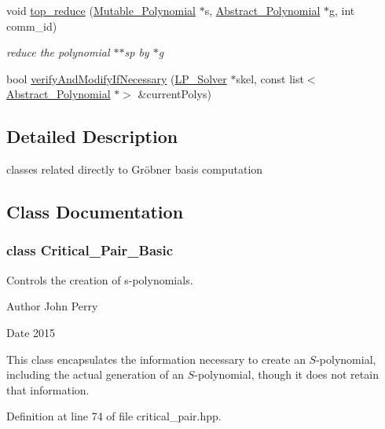 \begin{DoxyCompactItemize}
void \hyperlink{group___g_b_computation_ga459782e1aa0e3b2b4a6569bcd27150cc}{top\+\_\+reduce} (\hyperlink{group__polygroup_class_mutable___polynomial}{Mutable\+\_\+\+Polynomial} $\ast$s, \hyperlink{group__polygroup_class_abstract___polynomial}{Abstract\+\_\+\+Polynomial} $\ast$g, int comm\+\_\+id)
\begin{DoxyCompactList}\small\item\em reduce the polynomial {\ttfamily $\ast$$\ast$sp} by {\ttfamily $\ast$g} \end{DoxyCompactList}\item 
bool \hyperlink{group___g_b_computation_ga7d0ce10bf904206db71f7e011ba551b3}{verify\+And\+Modify\+If\+Necessary} (\hyperlink{group___c_l_s_solvers_class_l_p___solver}{L\+P\+\_\+\+Solver} $\ast$skel, const list$<$ \hyperlink{group__polygroup_class_abstract___polynomial}{Abstract\+\_\+\+Polynomial} $\ast$$>$ \&current\+Polys)
\end{DoxyCompactItemize}


\subsection{Detailed Description}
classes related directly to Gr\"{o}bner basis computation 



\subsection{Class Documentation}
\label{class_critical___pair___basic}
\subsubsection{class Critical\+\_\+\+Pair\+\_\+\+Basic}
Controls the creation of s-\/polynomials. 

\begin{DoxyAuthor}{Author}
John Perry 
\end{DoxyAuthor}
\begin{DoxyDate}{Date}
2015
\end{DoxyDate}
This class encapsulates the information necessary to create an $S$-\/polynomial, including the actual generation of an $S$-\/polynomial, though it does not retain that information. 

Definition at line 74 of file critical\+\_\+pair.\+hpp.

